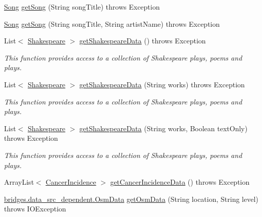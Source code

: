 \begin{DoxyCompactItemize}
\item 
\hyperlink{classbridges_1_1data__src__dependent_1_1_song}{Song} \hyperlink{classbridges_1_1connect_1_1_data_source_a4f49b088703c74d68bd854d40edc5ad4}{get\+Song} (String song\+Title)  throws Exception 
\item 
\hyperlink{classbridges_1_1data__src__dependent_1_1_song}{Song} \hyperlink{classbridges_1_1connect_1_1_data_source_a935ea2005b7de3cb22c1e55027b81460}{get\+Song} (String song\+Title, String artist\+Name)  throws Exception 
\item 
List$<$ \hyperlink{classbridges_1_1data__src__dependent_1_1_shakespeare}{Shakespeare} $>$ \hyperlink{classbridges_1_1connect_1_1_data_source_af2b6e5df074d0a689e8a992b1bea6f3e}{get\+Shakespeare\+Data} ()  throws Exception 
\begin{DoxyCompactList}\small\item\em This function provides access to a collection of Shakespeare plays, poems and plays. \end{DoxyCompactList}\item 
List$<$ \hyperlink{classbridges_1_1data__src__dependent_1_1_shakespeare}{Shakespeare} $>$ \hyperlink{classbridges_1_1connect_1_1_data_source_a04aa757c45139e52525d4b09156abfe1}{get\+Shakespeare\+Data} (String works)  throws Exception 
\begin{DoxyCompactList}\small\item\em This function provides access to a collection of Shakespeare plays, poems and plays. \end{DoxyCompactList}\item 
List$<$ \hyperlink{classbridges_1_1data__src__dependent_1_1_shakespeare}{Shakespeare} $>$ \hyperlink{classbridges_1_1connect_1_1_data_source_abf8e8f8ff3eb14fa6c6b5ce6b48dbadb}{get\+Shakespeare\+Data} (String works, Boolean text\+Only)  throws Exception 
\begin{DoxyCompactList}\small\item\em This function provides access to a collection of Shakespeare plays, poems and plays. \end{DoxyCompactList}\item 
Array\+List$<$ \hyperlink{classbridges_1_1data__src__dependent_1_1_cancer_incidence}{Cancer\+Incidence} $>$ \hyperlink{classbridges_1_1connect_1_1_data_source_a320ce56eeb655c54c0fbed455e0d9f5e}{get\+Cancer\+Incidence\+Data} ()  throws Exception 
\item 
\hyperlink{classbridges_1_1data__src__dependent_1_1_osm_data}{bridges.\+data\+\_\+src\+\_\+dependent.\+Osm\+Data} \hyperlink{classbridges_1_1connect_1_1_data_source_ae82f6a4feff0af28f4aae55986e1560c}{get\+Osm\+Data} (String location, String level)  throws I\+O\+Exception 

\end{DoxyCompactItemize}
